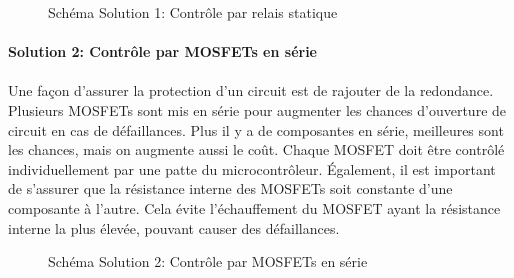 		\begin{figure}[H]
			\centering
			\caption[]{Schéma Solution 1: Contrôle par relais statique}
			\label{fig:contactorsol1}
		\end{figure}


		\paragraph*{Solution 2: Contrôle par MOSFETs en série}
		\paragraph*{}
		Une façon d'assurer la protection d'un circuit est de rajouter de la redondance. Plusieurs MOSFETs sont mis en série pour augmenter les chances d'ouverture de circuit en cas de défaillances. Plus il y a de composantes en série, meilleures sont les chances, mais on augmente aussi le coût. Chaque MOSFET doit être contrôlé individuellement par une patte du microcontrôleur. Également, il est important de s'assurer que la résistance interne des MOSFETs soit constante d'une composante à l'autre. Cela évite l'échauffement du MOSFET ayant la résistance interne la plus élevée, pouvant causer des défaillances.

		\begin{figure}[H]
			\centering
			\caption{Schéma Solution 2: Contrôle par MOSFETs en série}
			\label{fig:contactorsol2}
		\end{figure}


